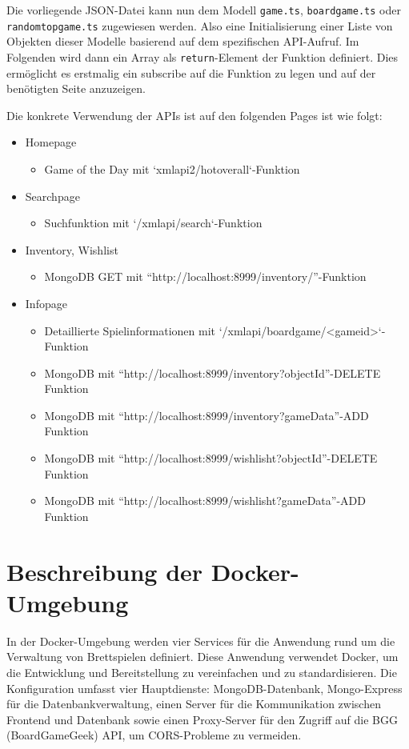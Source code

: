 Die vorliegende JSON-Datei kann nun dem Modell \texttt{game.ts}, \texttt{boardgame.ts} oder \\\texttt{randomtopgame.ts} zugewiesen werden. Also eine Initialisierung einer Liste von Objekten dieser Modelle basierend auf dem spezifischen \ac{API}-Aufruf.
Im Folgenden wird dann ein Array als \texttt{return}-Element der Funktion definiert. Dies ermöglicht es erstmalig ein subscribe auf die Funktion zu legen und auf der benötigten Seite anzuzeigen. \bigskip 

Die konkrete Verwendung der APIs ist auf den folgenden Pages ist wie folgt:

\begin{itemize}
    \setlength{\itemsep}{-1pt}
    \setlength{\parskip}{-1pt}
    \item Homepage
        \begin{itemize}
        \item Game of the Day mit `xmlapi2/hotoverall`-Funktion
        \end{itemize}
    \item Searchpage
        \begin{itemize}
        \item Suchfunktion mit `/xmlapi/search`-Funktion
        \end{itemize}
    \item Inventory, Wishlist
        \begin{itemize}
        \item MongoDB GET mit ``http://localhost:8999/inventory/''-Funktion 
        \end{itemize}
    \item Infopage
    \begin{itemize}
    \item Detaillierte Spielinformationen mit `/xmlapi/boardgame/<gameid>`-Funktion 
    \item MongoDB mit ``http://localhost:8999/inventory?objectId''-DELETE Funktion
    \item MongoDB mit ``http://localhost:8999/inventory?gameData''-ADD Funktion
    \item MongoDB mit ``http://localhost:8999/wishlisht?objectId''-DELETE Funktion
    \item MongoDB mit ``http://localhost:8999/wishlisht?gameData''-ADD Funktion
    \end{itemize}

\end{itemize}
\section{Beschreibung der Docker-Umgebung}
In der Docker-Umgebung werden vier Services für die Anwendung rund um die Verwaltung
von Brettspielen definiert. Diese Anwendung verwendet Docker, um die Entwicklung und
Bereitstellung zu vereinfachen und zu standardisieren. Die Konfiguration umfasst vier
Hauptdienste: MongoDB-Datenbank, Mongo-Express für die Datenbankverwaltung, einen
Server für die Kommunikation zwischen Frontend und Datenbank sowie einen Proxy-Server
für den Zugriff auf die BGG (BoardGameGeek) API, um CORS-Probleme zu vermeiden.
